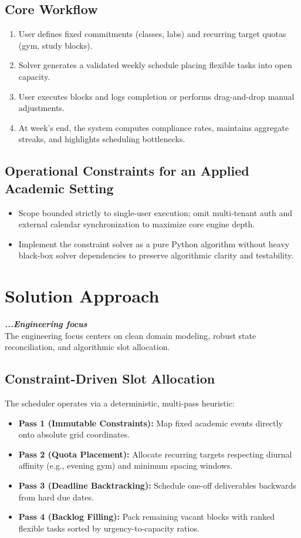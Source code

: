 \documentclass[11pt,a4paper]{article}
\begin{document}
\subsection{Core Workflow}
\begin{enumerate}
    \item User defines fixed commitments (classes, labs) and recurring target quotas (gym, study blocks).
    \item Solver generates a validated weekly schedule placing flexible tasks into open capacity.
    \item User executes blocks and logs completion or performs drag-and-drop manual adjustments.
    \item At week's end, the system computes compliance rates, maintains aggregate streaks, and highlights scheduling bottlenecks.
\end{enumerate}

\subsection{Operational Constraints for an Applied Academic Setting}
\begin{itemize}
    \item Scope bounded strictly to single-user execution; omit multi-tenant auth and external calendar synchronization to maximize core engine depth.
    \item Implement the constraint solver as a pure Python algorithm without heavy black-box solver dependencies to preserve algorithmic clarity and testability.
\end{itemize}

\section{Solution Approach}
\textbf{\textit{...Engineering focus}} \\
The engineering focus centers on clean domain modeling, robust state reconciliation, and algorithmic slot allocation.

\subsection{Constraint-Driven Slot Allocation}
The scheduler operates via a deterministic, multi-pass heuristic:
\begin{itemize}
    \item \textbf{Pass 1 (Immutable Constraints):} Map fixed academic events directly onto absolute grid coordinates.
    \item \textbf{Pass 2 (Quota Placement):} Allocate recurring targets respecting diurnal affinity (e.g., evening gym) and minimum spacing windows.
    \item \textbf{Pass 3 (Deadline Backtracking):} Schedule one-off deliverables backwards from hard due dates.
    \item \textbf{Pass 4 (Backlog Filling):} Pack remaining vacant blocks with ranked flexible tasks sorted by urgency-to-capacity ratios.
\end{itemize}
\end{document}
